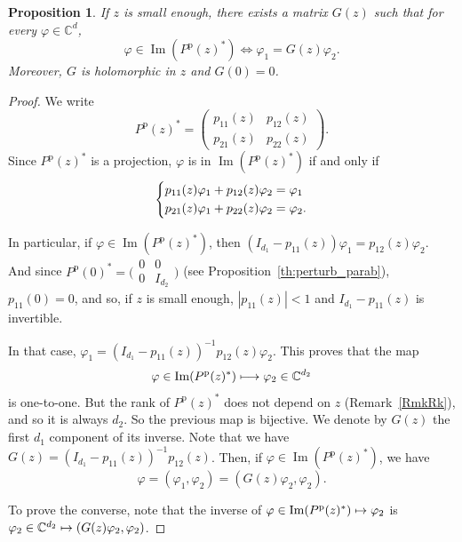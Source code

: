 \documentclass[JEP,XML,SOM,Unicode,NoEqCountersInSection]{cedram}
\def\mto{\mathchoice{\longmapsto}{\mapsto}{\mapsto}{\mapsto}}
\theoremstyle{plain}
\newtheorem{prop}[theorem]{Proposition}
\theoremstyle{definition}
\theoremstyle{remark}
\DeclareMathOperator{\Ima}{Im}
\newcommand{\set}{\mathbb}
\renewcommand{\C}{\set{C}}
\newcommand{\p}{{\mathrm p}}
\let\originalleft\left
\let\originalright\right
\renewcommand{\left}{\mathopen{}\mathclose\bgroup\originalleft}
\renewcommand{\right}{\aftergroup\egroup\originalright}
\begin{document}
\begin{prop}
\label{Prop:DefG}
If $z$ is small enough, there exists a matrix $G(z)$ such that for every $\varphi\in\set C^d$,
\[
\varphi\in\Ima(P^\p(z)^\ast) \iff \varphi_1 = G(z)\varphi_2.
\]
Moreover, $G$ is holomorphic in $z$ and $G(0) = 0$.
\end{prop}
\begin{proof}
We write
\[
P^\p(z)^\ast = \begin{pmatrix} p_{11}(z)&p_{12}(z)\\p_{21}(z)&p_{22}(z)\end{pmatrix}.
\]
Since $P^\p(z)^\ast$ is a projection, $\varphi$ is in $\Ima (P^\p(z)^\ast)$ if and only if
\begin{equation*}
\left\{\begin{aligned}p_{11}(z)\varphi_1 + p_{12}(z)\varphi_2 &= \varphi_1\\
p_{21}(z)\varphi_1 + p_{22}(z)\varphi_2 &= \varphi_2. \end{aligned}\right.
\end{equation*}

In particular, if $\varphi\in\Ima(P^\p(z)^\ast)$, then $(I_{d_1}-p_{11}(z))\varphi_1 = p_{12}(z) \varphi_2$. And since $P^\p(0)^\ast = \big(\begin{smallmatrix}0&0\\0&I_{d_2}\end{smallmatrix} \big)$ (see Proposition~\ref{th:perturb_parab}), $p_{11}(0) = 0$, and so, if $z$ is small enough, $|p_{11}(z)|<1$ and $I_{d_1} - p_{11}(z)$ is invertible.

In that case, $\varphi_1 = (I_{d_1} - p_{11}(z))^{-1} p_{12}(z) \varphi_2$. This proves that the map
\[
\varphi \in \Ima(P^\p(z)^\ast) \mto \varphi_2 \in \C^{d_2}
\]
is one-to-one. But the rank of $P^\p(z)^\ast$ does not depend on $z$ (Remark~\ref{RmkRk}), and so it is always $d_2$. So the previous map is bijective. We denote by $G(z)$ the first $d_1$ component of its inverse. Note that we have $G(z) = (I_{d_1} - p_{11}(z))^{-1} p_{12}(z)$. Then, if $\varphi\in\Ima(P^\p(z)^\ast)$, we have
\[
\varphi = (\varphi_1,\varphi_2) = (G(z)\varphi_2,\varphi_2).
\]

To prove the converse, note that the inverse of $\varphi\in\Ima(P^\p(z)^\ast)\mto \varphi_2$ is $\varphi_2\in\C^{d_2}\mto (G(z)\varphi_2,\varphi_2)$.
\end{proof}
\end{document}
